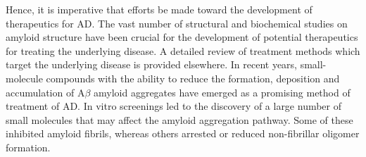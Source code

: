 

Hence, it is imperative that efforts be made toward the development of therapeutics for AD. The vast number of structural and biochemical studies on amyloid structure have been crucial for the development of potential therapeutics for treating the underlying disease. A detailed review of treatment methods which target the underlying disease is provided elsewhere.\cite{Salomone:2012fh} In recent years, small-molecule compounds with the ability to reduce the formation, deposition and accumulation of A$\beta$ amyloid aggregates have emerged as a promising method of treatment of AD. 
In vitro screenings led to the discovery of a large number of small molecules that may affect the amyloid aggregation pathway.\cite{Ryan:2012bh} Some of these inhibited amyloid fibrils, whereas others arrested or reduced non-fibrillar oligomer formation.\cite{Necula:2007p5049,LeVine:2007jd} %

